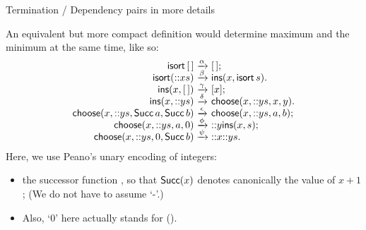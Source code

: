 %
\begin{frame}{Termination / Dependency pairs in more details}

  An equivalent but more compact definition would determine maximum
  and the minimum at the same time, like so:
\begin{equation*}
\begin{array}{r@{\;}c@{\;}l}
  \fun{isort}\,\el
& \smashedrightarrow{\alpha}
& \el;\\
  \fun{isort}(\cons{x}{s})
& \smashedrightarrow{\beta}
& \fun{ins}(x,\fun{isort}\,s).\\
  \fun{ins}(x, \el)
& \smashedrightarrow{\gamma}
& [x];\\
   \fun{ins}(x,\cons{y}{s})
& \smashedrightarrow{\delta}
& \fun{choose}(x, \cons{y}{s}, x, y).\\
  \fun{choose}(x, \cons{y}{s}, \fun{Succ}\,a, \fun{Succ}\,b)
& \smashedrightarrow{\epsilon}
& \fun{choose}(x, \cons{y}{s}, a, b);\\
  \fun{choose}(x, \cons{y}{s}, a, 0)
& \smashedrightarrow{\phi}
& \cons{y}{\fun{ins}(x,s)};\\
  \fun{choose}(x, \cons{y}{s}, 0, \fun{Succ}\,b)
& \smashedrightarrow{\psi}
& \cons{x}{\cons{y}{s}}.
\end{array}
\end{equation*}
Here, we use Peano's unary encoding of integers:
\begin{itemize}

  \item the successor function , so that \(\textsf{Succ}(x)\)
    denotes canonically the value of \(x+1\); (We do not have to assume
    `-'.)

  \item Also, `0' here actually stands for ().

\end{itemize}

\end{frame}

